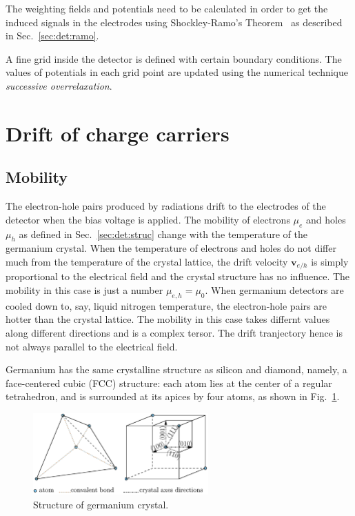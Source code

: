The weighting fields and potentials need to be calculated in order to get the induced signals in the electrodes using Shockley-Ramo's Theorem~\cite{Gat82, Rad88, He00} as described in Sec.~\ref{sec:det:ramo}. 

A fine grid inside the detector is defined with certain boundary conditions. The values of potentials in each grid point are updated using the numerical technique \emph{successive overrelaxation}.


\section{Drift of charge carriers}
\label{sec:pss:drift}

\subsection{Mobility}
\label{sec:pss:mobi}
The electron-hole pairs produced by radiations drift to the electrodes of the detector when the bias voltage is applied. The mobility of electrons $\mu_{e}$ and holes $\mu_{h}$ as defined in Sec.~\ref{sec:det:struc} change with the temperature of the germanium crystal. When the temperature of electrons and holes do not differ much from the temperature of the crystal lattice, the drift velocity $\mathbf{v}_{e/h}$ is simply proportional to the electrical field and the crystal structure has no influence. The mobility in this case is just a number $\mu_{e,h} = \mu_{0}$. When germanium detectors are cooled down to, say, liquid nitrogen temperature, the electron-hole pairs are hotter than the crystal lattice. The mobility in this case takes differnt values along different directions and is a complex tersor. The drift tranjectory hence is not always parallel to the electrical field.

Germanium has the same crystalline structure as silicon and diamond, namely, a face-centered cubic (FCC) structure: each atom lies at the center of a regular tetrahedron, and is surrounded at its apices by four atoms, as shown in Fig.~\ref{fig:pss:xtal}.

\begin{figure}
\centering
\includegraphics[width=0.6\textwidth]{xtalStruc}  
\caption{Structure of germanium crystal.}
\label{fig:pss:xtal}
\end{figure}

